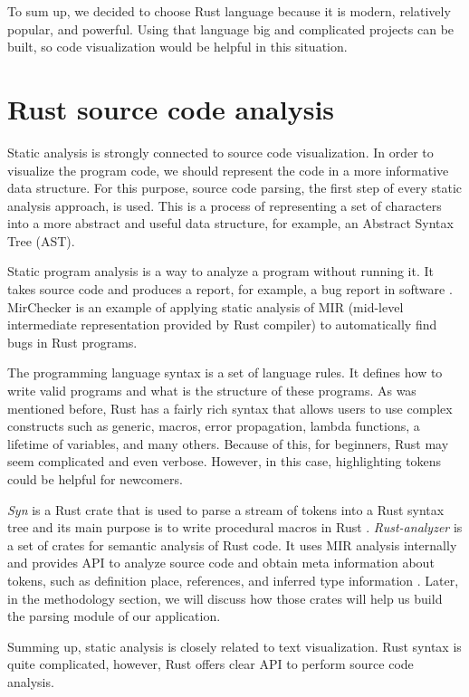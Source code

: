 To sum up, we decided to choose Rust language because it is modern, relatively popular, and powerful. Using that language big and complicated projects can be built, so code visualization would be helpful in this situation.

\section{Rust source code analysis}
\label{sec:anal}
Static analysis is strongly connected to source code visualization. In order to visualize the program code, we should represent the code in a more informative data structure. For this purpose, source code parsing, the first step of every static analysis approach, is used. This is a process of representing a set of characters into a more abstract and useful data structure, for example, an Abstract Syntax Tree (AST). 

Static program analysis is a way to analyze a program without running it. It takes source code and produces a report, for example, a bug report in software \cite{anal}. MirChecker \cite{mirchecker} is an example of applying static analysis of MIR (mid-level intermediate representation provided by Rust compiler) to automatically find bugs in Rust programs. 

The programming language syntax is a set of language rules. It defines how to write valid programs and what is the structure of these programs. As was mentioned before, Rust has a fairly rich syntax that allows users to use complex constructs such as generic, macros, error propagation, lambda functions, a lifetime of variables, and many others. 
Because of this, for beginners, Rust may seem complicated and even verbose. However, in this case, highlighting tokens could be helpful for newcomers.

\textit{Syn} is a Rust crate that is used to parse a stream of tokens into a Rust syntax tree and its main purpose is to write procedural macros in Rust \cite{crates-syn}. 
\textit{Rust-analyzer} is a set of crates for semantic analysis of Rust code. It uses MIR analysis internally and provides API to analyze source code and obtain meta information about tokens, such as definition place, references, and inferred type information \cite{crates-rust-analyzer}. Later, in the methodology section, we will discuss how those crates will help us build the parsing module of our application.

Summing up, static analysis is closely related to text visualization. Rust syntax is quite complicated, however, Rust offers clear API to perform source code analysis.

